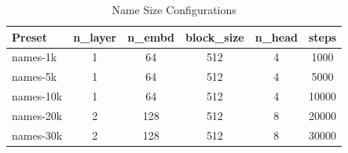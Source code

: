 
\begin{table}[H]
\centering
\begin{tabular}{lccccc}
\hline
\textbf{Preset} & \textbf{n\_layer} & \textbf{n\_embd} & \textbf{block\_size} & \textbf{n\_head} & \textbf{steps} \\
\hline
names-1k   & 1 & 64  & 512 & 4 & 1000  \\
names-5k   & 1 & 64  & 512 & 4 & 5000  \\
names-10k  & 1 & 64  & 512 & 4 & 10000 \\
names-20k  & 2 & 128 & 512 & 8 & 20000 \\
names-30k  & 2 & 128 & 512 & 8 & 30000 \\
\hline
\end{tabular}
\caption{Name Size Configurations}
\end{table}

